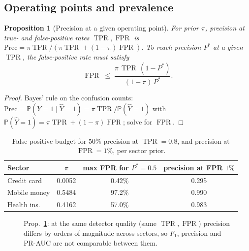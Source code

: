 \documentclass[journal]{IEEEtran}
\newtheorem{proposition}{Proposition}
\newcommand{\Prob}{\mathbb{P}}
\newcommand{\1}{\mathbf{1}}
\DeclareMathOperator{\TPR}{TPR}
\DeclareMathOperator{\FPR}{FPR}
\begin{document}
\subsection{Operating points and prevalence}\label{sec:oppoint}
\begin{proposition}[Precision at a given operating point]\label{prop:prec}
For prior $\pi$, precision at true- and false-positive rates $\TPR,\FPR$ is $\mathrm{Prec}=\pi\TPR/(\pi\TPR+(1-\pi)\FPR)$. To reach precision $P^\ast$ at a given $\TPR$, the false-positive rate must satisfy
\begin{equation}
\FPR\;\le\;\frac{\pi\,\TPR\,(1-P^\ast)}{(1-\pi)\,P^\ast}.
\end{equation}
\end{proposition}
\begin{proof}
Bayes' rule on the confusion counts: $\mathrm{Prec}=\Prob(Y{=}1\mid\hat Y{=}1)=\pi\TPR/\Prob(\hat Y{=}1)$ with $\Prob(\hat Y{=}1)=\pi\TPR+(1-\pi)\FPR$; solve for $\FPR$. \end{proof}
\begin{table}[t]
\centering
\caption{False-positive budget for $50\%$ precision at $\TPR=0.8$, and precision at $\FPR=1\%$, per sector prior.}
\label{tab:fpr}
\small
\begin{tabular}{@{}lccc@{}}
\toprule
Sector & $\pi$ & max FPR for $P^\ast=0.5$ & precision at FPR $1\%$ \\
\midrule
Credit card & 0.0052 & 0.42\% & 0.295 \\
Mobile money & 0.5484 & 97.2\% & 0.990 \\
Health ins. & 0.4162 & 57.0\% & 0.983 \\
\bottomrule
\end{tabular}
\end{table}
\begin{figure}[t]
\centering
{}
\caption{Prop.~\ref{prop:prec}: at the same detector quality (same $\TPR,\FPR$) precision differs by orders of magnitude across sectors, so $F_1$, precision and PR-AUC are not comparable between them.}
\label{fig:prec}
\end{figure}
\end{document}
